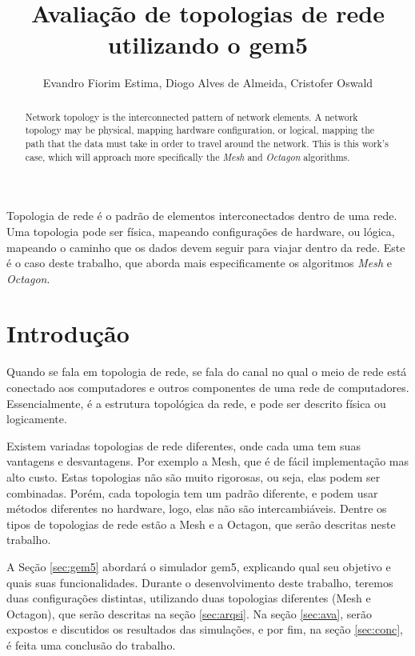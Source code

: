 \documentclass[12pt]{article}
\title{Avaliação de topologias de rede utilizando o gem5}
\author{Evandro Fiorim Estima\inst{1}, Diogo Alves de Almeida\inst{2}, Cristofer Oswald \inst{3}}
\begin{document}
 

\maketitle

\begin{resumo}
Topologia de rede é o padrão de elementos interconectados dentro de uma rede. Uma topologia pode ser física, mapeando configurações de hardware, ou lógica, mapeando o caminho que os dados devem seguir para viajar dentro da rede. Este é o caso deste trabalho, que aborda mais especificamente os algoritmos \textit{Mesh} e \textit{Octagon}.   
\end{resumo}

\begin{abstract}
Network topology is the interconnected pattern of network elements. A network topology may be physical, mapping hardware configuration, or logical, mapping the path that the data must take in order to travel around the network. This is this work's case, which will approach more specifically the \textit{Mesh} and \textit{Octagon} algorithms.
\end{abstract}


\section{Introdução}
Quando se fala em topologia de rede, se fala do canal no qual o meio de rede está conectado aos computadores e outros componentes de uma rede de computadores. Essencialmente, é a estrutura topológica da rede, e pode ser descrito física ou logicamente. 

Existem variadas topologias de rede diferentes, onde cada uma tem suas vantagens e desvantagens. Por exemplo a Mesh, que é de fácil implementação mas alto custo. Estas topologias não são muito rigorosas, ou seja, elas podem ser combinadas. Porém, cada topologia tem um padrão diferente, e podem usar métodos diferentes no hardware, logo, elas não são intercambiáveis. Dentre os tipos de topologias de rede estão a Mesh e a Octagon, que serão descritas neste trabalho.

A Seção \ref{sec:gem5} abordará o simulador gem5, explicando qual seu objetivo e quais suas funcionalidades. Durante o desenvolvimento deste trabalho, teremos duas configurações distintas, utilizando duas topologias diferentes (Mesh e Octagon), que serão descritas na seção \ref{sec:arqsi}. Na seção \ref{sec:ava}, serão expostos e discutidos os resultados das simulações, e por fim, na seção \ref{sec:conc}, é feita uma conclusão do trabalho.
\end{document}
